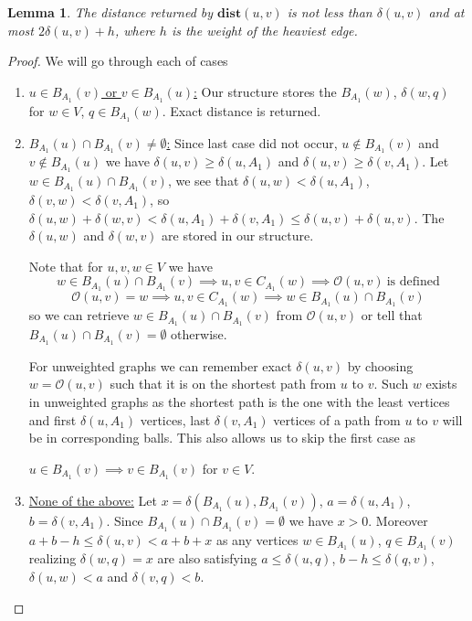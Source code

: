 \documentclass[shortabstract, lic, english]{iithesis}
\theoremstyle{definition} \newtheorem{definition}{Definition}[chapter]
\theoremstyle{plain} \newtheorem{remark}[definition]{Observation}
\theoremstyle{plain} \newtheorem{theorem}[definition]{Theorem}
\theoremstyle{plain} \newtheorem{lemma}[definition]{Lemma}
\theoremstyle{plain} \newtheorem{conjecture}[definition]{Conjecture}
\begin{document}
\begin{lemma}
    The distance returned by $\mathbf{dist}(u, v)$ is not less than $\delta(u,v)$ and at most $2 \delta(u,v) + h$, where $h$ is the weight of the heaviest edge.
\end{lemma}
\begin{proof}
    We will go through each of cases
    \begin{enumerate}
        \item \underline{$u \in B_{A_1}(v)$ or $v \in B_{A_1}(u)$:}\newline
            Our structure stores the $B_{A_1}(w)$, $\delta(w, q)$ for $w \in V$, $q \in B_{A_1}(w)$. Exact distance is returned.
        \item \underline{$B_{A_1}(u) \cap B_{A_1}(v) \neq \emptyset$:}\newline
            Since last case did not occur, $u \notin B_{A_1}(v)$ and $v \notin B_{A_1}(u)$ we have $\delta(u,v) \geq \delta(u, A_1)$ and $\delta(u,v) \geq \delta(v, A_1)$.
            Let $w \in B_{A_1}(u) \cap B_{A_1}(v)$, we see that $\delta(u, w) < \delta(u, A_1)$, $\delta(v, w) < \delta(v, A_1)$,
            so $\delta(u, w) + \delta(w, v) < \delta(u, A_1) + \delta(v, A_1) \leq \delta(u,v) + \delta(u,v)$.
            The $\delta(u, w)$ and $\delta(w, v)$ are stored in our structure.
            
            Note that for $u,v,w \in V$ we have
            $$w \in B_{A_1}(u) \cap B_{A_1}(v) \implies u,v \in C_{A_1}(w) \implies \mathcal{O}(u,v)~\text{is defined}$$
            $$\mathcal{O}(u, v) = w \implies u,v \in C_{A_1}(w) \implies w \in B_{A_1}(u) \cap B_{A_1}(v)$$
            so we can retrieve $w \in B_{A_1}(u) \cap B_{A_1}(v)$ from $\mathcal{O}(u,v)$ or tell that $B_{A_1}(u) \cap B_{A_1}(v) = \emptyset$ otherwise.

            For unweighted graphs we can remember exact $\delta(u, v)$ by choosing $w = \mathcal{O}(u,v)$ such that it is on the shortest path from $u$ to $v$.
            Such $w$ exists in unweighted graphs as the shortest path is the one with the least vertices and first $\delta(u, A_1)$ vertices, last $\delta(v, A_1)$ vertices of a path from $u$ to $v$ will be in corresponding balls.
            This also allows us to skip the first case as

            $u \in B_{A_1}(v) \implies v \in B_{A_1}(v)$ for $v \in V$.
        \item \underline{None of the above:}\newline
            Let $x = \delta(B_{A_1}(u), B_{A_1}(v))$, $a = \delta(u, A_1)$, $b = \delta(v, A_1)$.
            Since $B_{A_1}(u) \cap B_{A_1}(v) = \emptyset$ we have $x > 0$.
            Moreover $a + b - h \leq \delta(u,v) < a + b + x$ as any vertices $w \in B_{A_1}(u)$, $q \in B_{A_1}(v)$ realizing
            $\delta(w, q) = x$ are also satisfying $a \leq \delta(u, q)$, $b - h \leq \delta(q, v)$, $\delta(u, w) < a$ and $\delta(v, q) < b$.


\end{enumerate}
\end{proof}
\end{document}
